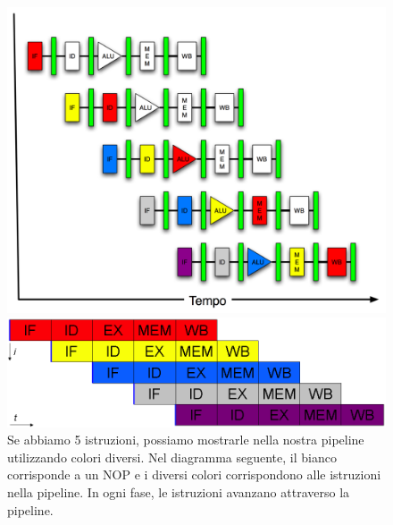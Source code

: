 \begin{frame}
		
		\begin{figure}[htbp]
		    \centering
		    \begin{minipage}{0.49\textwidth}
		        \centering
		        \includegraphics[width=1.0\linewidth]{images/7_pipeline/pipeline_in_time.png}
		    \end{minipage}
		    \hfill
		    \begin{minipage}{0.49\textwidth}
		        \centering 
				\includegraphics[width=1.0\linewidth]{images/7_pipeline/pipeline_five_stages.png}
		    \end{minipage}
		    \caption{Se abbiamo 5 istruzioni, possiamo mostrarle nella nostra pipeline utilizzando colori diversi. Nel diagramma seguente, il bianco corrisponde a un NOP e i diversi colori corrispondono alle istruzioni nella pipeline. In ogni fase, le istruzioni avanzano attraverso la pipeline.}
		    \label{fig:pipeline_pipeline_in_time}
		\end{figure}
		

\end{frame}



